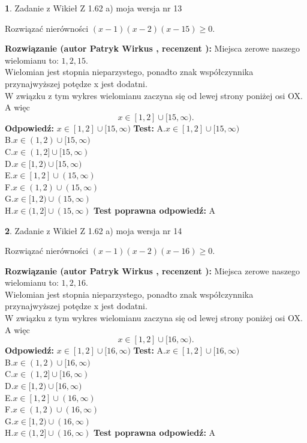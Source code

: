 \documentclass[12pt, a4paper]{article}
\theoremstyle{definition} %
\newtheorem{zad}{}
\newcommand{\zadStart}[1]{\begin{zad}#1\newline}
\newcommand{\zadStop}{\end{zad}}
\newcommand{\rozwStart}[2]{\noindent \textbf{Rozwiązanie (autor #1 , recenzent #2): }\newline}
\newcommand{\rozwStop}{\newline}
\newcommand{\odpStart}{\noindent \textbf{Odpowiedź:}\newline}
\newcommand{\odpStop}{\newline}
\newcommand{\testStart}{\noindent \textbf{Test:}\newline}
\newcommand{\testStop}{\newline}
\newcommand{\kluczStart}{\noindent \textbf{Test poprawna odpowiedź:}\newline}
\newcommand{\kluczStop}{\newline}
\begin{document}
\zadStart{Zadanie z Wikieł Z 1.62 a) moja wersja nr 13}

Rozwiązać nierówności $(x-1)(x-2)(x-15)\ge0$.
\zadStop
\rozwStart{Patryk Wirkus}{}
Miejsca zerowe naszego wielomianu to: $1, 2, 15$.\\
Wielomian jest stopnia nieparzystego, ponadto znak współczynnika przy\linebreak najwyższej potędze x jest dodatni.\\ W związku z tym wykres wielomianu zaczyna się od lewej strony poniżej osi OX. A więc $$x \in [1,2] \cup [15,\infty).$$
\rozwStop
\odpStart
$x \in [1,2] \cup [15,\infty)$
\odpStop
\testStart
A.$x \in [1,2] \cup [15,\infty)$\\
B.$x \in (1,2) \cup [15,\infty)$\\
C.$x \in (1,2] \cup [15,\infty)$\\
D.$x \in [1,2) \cup [15,\infty)$\\
E.$x \in [1,2] \cup (15,\infty)$\\
F.$x \in (1,2) \cup (15,\infty)$\\
G.$x \in [1,2) \cup (15,\infty)$\\
H.$x \in (1,2] \cup (15,\infty)$
\testStop
\kluczStart
A
\kluczStop



\zadStart{Zadanie z Wikieł Z 1.62 a) moja wersja nr 14}

Rozwiązać nierówności $(x-1)(x-2)(x-16)\ge0$.
\zadStop
\rozwStart{Patryk Wirkus}{}
Miejsca zerowe naszego wielomianu to: $1, 2, 16$.\\
Wielomian jest stopnia nieparzystego, ponadto znak współczynnika przy\linebreak najwyższej potędze x jest dodatni.\\ W związku z tym wykres wielomianu zaczyna się od lewej strony poniżej osi OX. A więc $$x \in [1,2] \cup [16,\infty).$$
\rozwStop
\odpStart
$x \in [1,2] \cup [16,\infty)$
\odpStop
\testStart
A.$x \in [1,2] \cup [16,\infty)$\\
B.$x \in (1,2) \cup [16,\infty)$\\
C.$x \in (1,2] \cup [16,\infty)$\\
D.$x \in [1,2) \cup [16,\infty)$\\
E.$x \in [1,2] \cup (16,\infty)$\\
F.$x \in (1,2) \cup (16,\infty)$\\
G.$x \in [1,2) \cup (16,\infty)$\\
H.$x \in (1,2] \cup (16,\infty)$
\testStop
\kluczStart
A
\kluczStop
\end{document}
